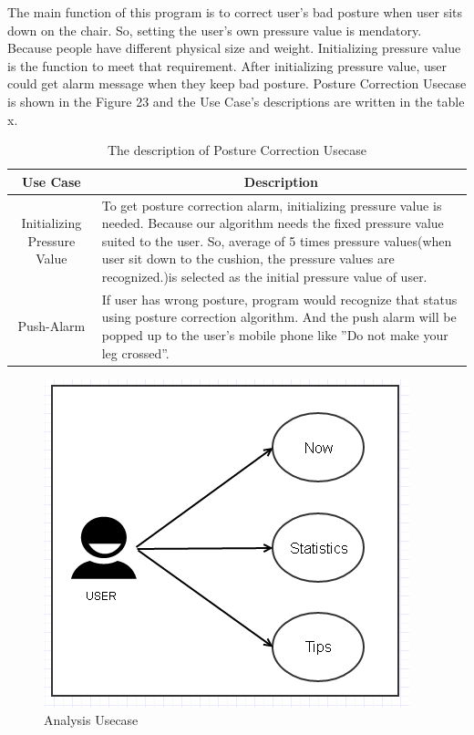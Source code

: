 \documentclass[conference]{IEEEtran}
\begin{document}
The main function of this program is to correct user's bad posture when user sits down on the chair. So, setting the user's own pressure value is mendatory. Because people have different physical size and weight. Initializing pressure value  is the function to meet that requirement. After initializing pressure value, user could get alarm message when they keep bad posture. Posture Correction Usecase is shown in the Figure 23 and the Use Case's descriptions are written in the table x.

\begin{table}[h]
{\renewcommand\arraystretch{1.25}
\caption{The description of Posture Correction Usecase}
\begin{tabular}{|c|l|l|} \hline
Use Case & \multicolumn{2}{c|}{Description} \\ \hline\hline
Initializing Pressure Value& \multicolumn{2}{p{4.5cm}|}{\raggedright To get posture correction alarm, initializing pressure value is needed. Because our algorithm needs the fixed pressure value suited to the user. So,  average of 5 times pressure values(when user sit down to the cushion, the pressure values are recognized.)is selected as the initial pressure value of user.} \\ \hline
Push-Alarm& \multicolumn{2}{p{4.5cm}|}{\raggedright If user has wrong posture, program would recognize that status using posture correction algorithm. And the push alarm will be popped up to the user's mobile phone like ''Do not make your leg crossed''.} \\ \hline
\end{tabular}}
\end{table}


\begin{figure}[H]
\begin{center}
    \includegraphics[scale=0.8]{img_21.png}
    \caption{Analysis Usecase} 
\end{center}
\end{figure}
               
\end{document}

